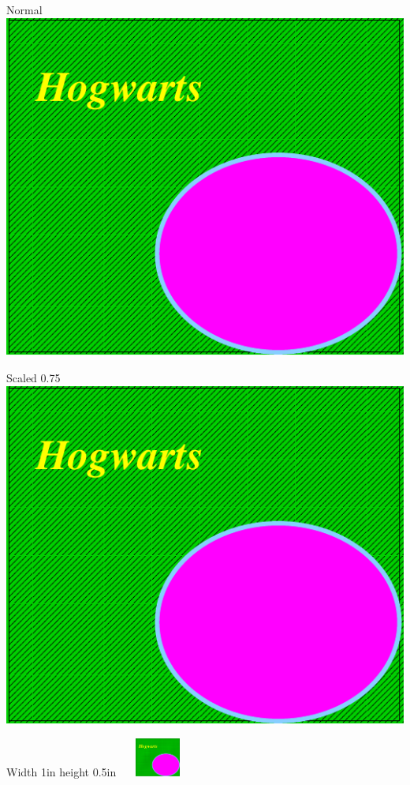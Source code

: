 \documentclass[]{article}
\begin{document}
Normal \includegraphics{hog}

Scaled 0.75 \includegraphics[scale=0.75]{hog}

Width 1in height 0.5in
  \includegraphics[width=1in,height=0.5in]{hog}
\end{document}
